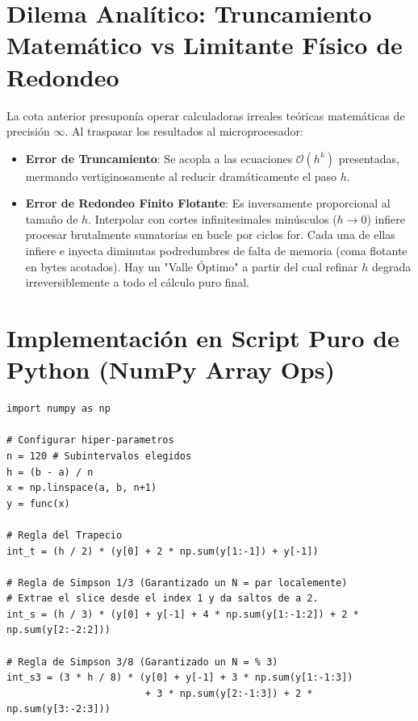 \documentclass[12pt,a4paper]{article}
\begin{document}
\section{Dilema Analítico: Truncamiento Matemático vs Limitante Físico de Redondeo}
La cota anterior presuponía operar calculadoras irreales teóricas matemáticas de precisión $\infty$.
Al traspasar los resultados al microprocesador:
\begin{itemize}
    \item \textbf{Error de Truncamiento}: Se acopla a las ecuaciones $\mathcal{O}(h^k)$ presentadas, mermando vertiginosamente al reducir dramáticamente el paso $h$.
    \item \textbf{Error de Redondeo Finito Flotante}: Es inversamente proporcional al tamaño de $h$. Interpolar con cortes infinitesimales minúsculos ($h \to 0$) infiere procesar brutalmente sumatorias en bucle por ciclos for. Cada una de ellas infiere e inyecta diminutas podredumbres de falta de memoria (coma flotante en bytes acotados). Hay un "Valle Óptimo" a partir del cual refinar $h$ degrada irreversiblemente a todo el cálculo puro final.
\end{itemize}

\section{Implementación en Script Puro de Python (NumPy Array Ops)}
\begin{lstlisting}
import numpy as np

# Configurar hiper-parametros
n = 120 # Subintervalos elegidos
h = (b - a) / n
x = np.linspace(a, b, n+1)
y = func(x)

# Regla del Trapecio
int_t = (h / 2) * (y[0] + 2 * np.sum(y[1:-1]) + y[-1])

# Regla de Simpson 1/3 (Garantizado un N = par localemente)
# Extrae el slice desde el index 1 y da saltos de a 2.
int_s = (h / 3) * (y[0] + y[-1] + 4 * np.sum(y[1:-1:2]) + 2 * np.sum(y[2:-2:2]))

# Regla de Simpson 3/8 (Garantizado un N = % 3)
int_s3 = (3 * h / 8) * (y[0] + y[-1] + 3 * np.sum(y[1:-1:3]) 
                        + 3 * np.sum(y[2:-1:3]) + 2 * np.sum(y[3:-2:3]))
\end{lstlisting}
\end{document}
